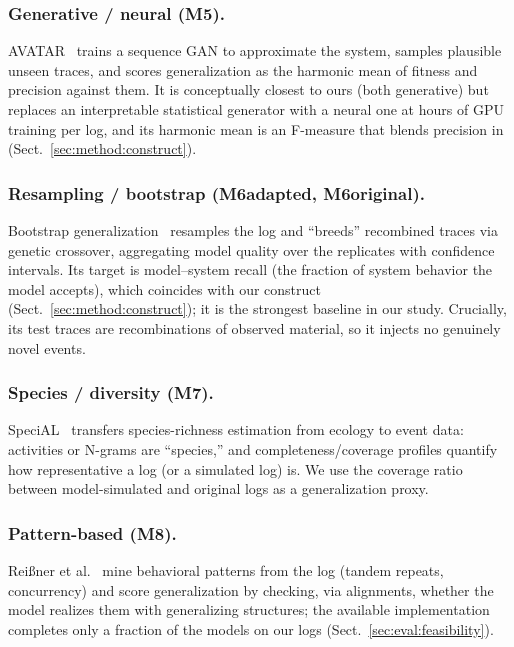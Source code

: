 \documentclass[runningheads]{llncs}
\newcommand{\chg}[1]{\textcolor{chgblue}{#1}}
\begin{document}
\subsubsection{Generative / neural (M5).}
AVATAR~\cite{theis2020avatar} trains a sequence GAN to approximate the system, samples plausible unseen traces, and scores generalization as the harmonic mean of fitness and precision against them. It is conceptually closest to ours (both generative) but replaces an interpretable statistical generator with a neural one at hours of GPU training per log, and its harmonic mean is an F-measure that blends precision in (Sect.~\ref{sec:method:construct}).

\subsubsection{Resampling / bootstrap (M6adapted, M6original).}
Bootstrap generalization~\cite{polyvyanyy2022bootstrap} resamples the log and ``breeds'' recombined traces via genetic crossover, aggregating model quality over the replicates with confidence intervals. Its target is model--system recall (the fraction of system behavior the model accepts), which coincides with our construct (Sect.~\ref{sec:method:construct}); it is the strongest baseline in our study. Crucially, its test traces are recombinations of observed material, so it injects no genuinely novel events.

\subsubsection{Species / diversity (M7).}
SpeciAL~\cite{kabierski2023species} transfers species-richness estimation from ecology to event data: activities or N-grams are ``species,'' and completeness/coverage profiles quantify how representative a log (or a simulated log) is. We use the coverage ratio between model-simulated and original logs as a generalization proxy.

\subsubsection{Pattern-based (M8).}
\chg{Rei{\ss}ner et al.~\cite{reissner2022pattern} mine behavioral patterns from the log (tandem repeats, concurrency) and score generalization by checking, via alignments, whether the model realizes them with generalizing structures;} the available implementation completes only a fraction of the models on our logs (Sect.~\ref{sec:eval:feasibility}).
\end{document}
